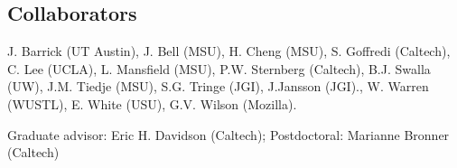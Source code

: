 \documentclass[margin,line]{resume}
\begin{document}
\begin{resume}
\section{\mysidestyle Collaborators}

J. Barrick (UT Austin), J. Bell (MSU), H. Cheng (MSU), S. Goffredi (Caltech), C. Lee (UCLA), L. Mansfield (MSU), P.W. Sternberg (Caltech), B.J. Swalla (UW), J.M. Tiedje (MSU), S.G. Tringe (JGI), J.Jansson (JGI)., W. Warren (WUSTL), E. White (USU), G.V. Wilson (Mozilla).

Graduate advisor:  Eric H. Davidson (Caltech); Postdoctoral: Marianne Bronner (Caltech)


\vspace{1cm}

\end{resume}
\end{document}
